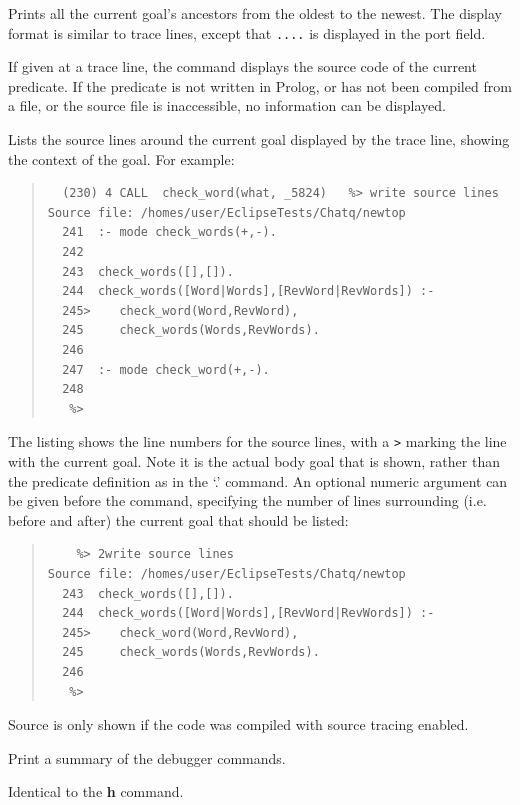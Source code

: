 \begin{descr}{1cm}

Prints all the current goal's ancestors from the oldest to the newest.
The display format is similar to trace lines,
except that {\tt ....} is displayed in the port field.

If given at a trace line, the command displays the source code of the
current predicate.
If the predicate is not written in Prolog, or has not been compiled from
a file, or the source file is inaccessible, no information can be displayed.

Lists the source lines around the current goal displayed by the trace line,
showing the context of the goal. For example:  

\begin{quote}\begin{verbatim}
  (230) 4 CALL  check_word(what, _5824)   %> write source lines
Source file: /homes/user/EclipseTests/Chatq/newtop
  241  :- mode check_words(+,-).
  242  
  243  check_words([],[]).
  244  check_words([Word|Words],[RevWord|RevWords]) :-
  245>    check_word(Word,RevWord),
  245     check_words(Words,RevWords).
  246  
  247  :- mode check_word(+,-).
  248  
   %> 
\end{verbatim}\end{quote}

The listing shows the line numbers for the source lines, with a \verb'>'
marking the line with the current goal. Note it is the actual body goal
that is shown, rather than the predicate definition as in the `.' command.
An optional numeric argument can be given before the command, specifying
the number of lines surrounding (i.e. before and after) the current goal
that should be listed:

\begin{quote}\begin{verbatim}
    %> 2write source lines
Source file: /homes/user/EclipseTests/Chatq/newtop
  243  check_words([],[]).
  244  check_words([Word|Words],[RevWord|RevWords]) :-
  245>    check_word(Word,RevWord),
  245     check_words(Words,RevWords).
  246  
   %> 
\end{verbatim}\end{quote}

Source is only shown if the code was compiled with source tracing enabled.

Print a summary of the debugger commands.

Identical to the {\bf h} command.

\end{descr}


